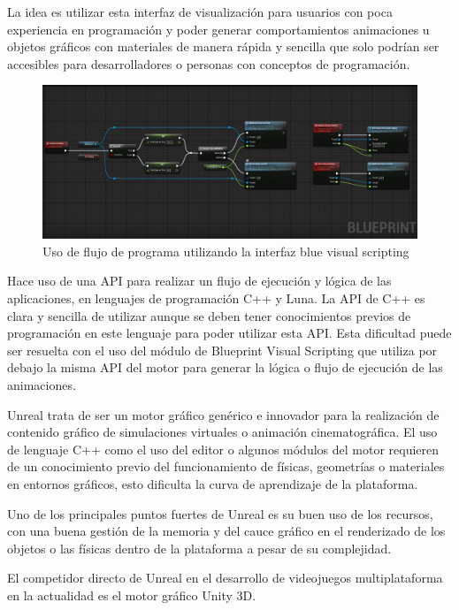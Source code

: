 \documentclass[a4paper, 17pt]{book}
\begin{document}
La idea es utilizar esta interfaz de visualización para usuarios con poca experiencia en programación
y poder generar comportamientos animaciones u objetos gráficos con materiales de manera rápida y
sencilla que solo podrían ser accesibles para desarrolladores o personas con conceptos de programación.

\begin{figure}[hbt!]
    \centering
    \includegraphics[scale=0.30, keepaspectratio]{img/option1_unreal.jpg}
    \caption{Uso de flujo de programa utilizando la interfaz blue visual scripting}
    \label{figura:option1_unreal}
\end{figure}

Hace uso de una API para realizar un flujo de ejecución y lógica de las aplicaciones, en lenguajes de
programación C++ y Luna. La API de C++ es clara y sencilla de utilizar aunque se deben tener conocimientos
previos de programación en este lenguaje para poder utilizar esta API. Esta dificultad puede ser resuelta
con el uso del módulo de  Blueprint Visual Scripting que utiliza por debajo la misma API del motor para
generar la lógica o flujo de ejecución de las animaciones.

Unreal trata de ser un motor gráfico genérico e innovador para la realización de contenido gráfico de
simulaciones virtuales o animación cinematográfica. El uso de lenguaje C++ como el uso del editor o
algunos módulos del motor requieren de un conocimiento previo del funcionamiento de físicas, geometrías
o materiales en entornos gráficos, esto dificulta la curva de aprendizaje de la plataforma.

Uno de los principales puntos fuertes de Unreal es su buen uso de los recursos, con una buena gestión
de la memoria y del cauce gráfico en el renderizado de los objetos o las físicas dentro de la plataforma
a pesar de su complejidad. 

El competidor directo de Unreal en el desarrollo de videojuegos multiplataforma en la actualidad es el
motor gráfico Unity 3D.
\end{document}
